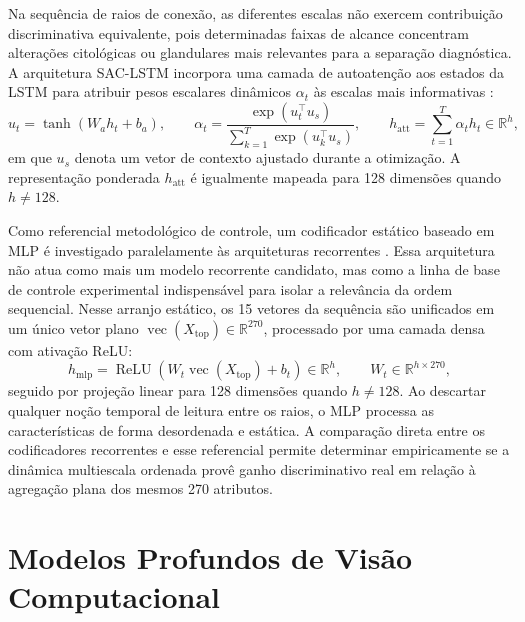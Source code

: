 Na sequência de raios de conexão, as diferentes escalas não exercem contribuição discriminativa equivalente, pois determinadas faixas de alcance concentram alterações citológicas ou glandulares mais relevantes para a separação diagnóstica. A arquitetura SAC-LSTM incorpora uma camada de autoatenção aos estados da LSTM para atribuir pesos escalares dinâmicos $\alpha_t$ às escalas mais informativas \cite{shalini2026saclstm}:
\begin{equation}
u_t = \tanh\!\left(W_a h_t + b_a\right), \qquad \alpha_t = \frac{\exp\!\left(u_t^\top u_s\right)}{\sum_{k=1}^{T} \exp\!\left(u_k^\top u_s\right)}, \qquad h_{\mathrm{att}} = \sum_{t=1}^{T} \alpha_t h_t \in \mathbb{R}^{h},
\label{eq:sac-lstm-att}
\end{equation}
em que $u_s$ denota um vetor de contexto ajustado durante a otimização. A representação ponderada $h_{\mathrm{att}}$ é igualmente mapeada para 128 dimensões quando $h \neq 128$.

Como referencial metodológico de controle, um codificador estático baseado em MLP é investigado paralelamente às arquiteturas recorrentes \cite{huang2022fusing,rumelhart1986learning}. Essa arquitetura não atua como mais um modelo recorrente candidato, mas como a linha de base de controle experimental indispensável para isolar a relevância da ordem sequencial. Nesse arranjo estático, os 15 vetores da sequência são unificados em um único vetor plano $\operatorname{vec}(X_{\mathrm{top}}) \in \mathbb{R}^{270}$, processado por uma camada densa com ativação ReLU:
\begin{equation}
h_{\mathrm{mlp}} = \operatorname{ReLU}\!\left(W_t \operatorname{vec}(X_{\mathrm{top}}) + b_t\right) \in \mathbb{R}^{h}, \qquad W_t \in \mathbb{R}^{h \times 270},
\label{eq:mlp-top-baseline}
\end{equation}
seguido por projeção linear para 128 dimensões quando $h \neq 128$. Ao descartar qualquer noção temporal de leitura entre os raios, o MLP processa as características de forma desordenada e estática. A comparação direta entre os codificadores recorrentes e esse referencial permite determinar empiricamente se a dinâmica multiescala ordenada provê ganho discriminativo real em relação à agregação plana dos mesmos 270 atributos.

\section{Modelos Profundos de Visão Computacional}
\label{sec:rede-visual}

